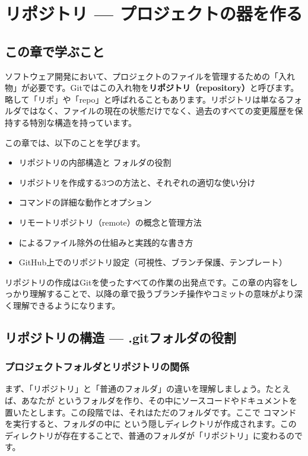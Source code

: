 \chapter{リポジトリ — プロジェクトの器を作る}

\section{この章で学ぶこと}

ソフトウェア開発において、プロジェクトのファイルを管理するための「入れ物」が必要です。Gitではこの入れ物を\textbf{リポジトリ（repository）}と呼びます。略して「リポ」や「repo」と呼ばれることもあります。リポジトリは単なるフォルダではなく、ファイルの現在の状態だけでなく、過去のすべての変更履歴を保持する特別な構造を持っています。

この章では、以下のことを学びます。

\begin{itemize}
  \item リポジトリの内部構造と  フォルダの役割
  \item リポジトリを作成する3つの方法と、それぞれの適切な使い分け
  \item {} コマンドの詳細な動作とオプション
  \item リモートリポジトリ（remote）の概念と管理方法
  \item {} によるファイル除外の仕組みと実践的な書き方
  \item GitHub上でのリポジトリ設定（可視性、ブランチ保護、テンプレート）
\end{itemize}

リポジトリの作成はGitを使ったすべての作業の出発点です。この章の内容をしっかり理解することで、以降の章で扱うブランチ操作やコミットの意味がより深く理解できるようになります。

\section{リポジトリの構造 — .gitフォルダの役割}

\subsection{プロジェクトフォルダとリポジトリの関係}

まず、「リポジトリ」と「普通のフォルダ」の違いを理解しましょう。たとえば、あなたが  というフォルダを作り、その中にソースコードやドキュメントを置いたとします。この段階では、それはただのフォルダです。ここで  コマンドを実行すると、フォルダの中に  という隠しディレクトリが作成されます。この  ディレクトリが存在することで、普通のフォルダが「リポジトリ」に変わるのです。

